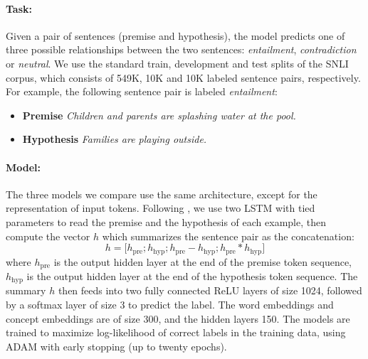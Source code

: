 
\paragraph{Task:}
Given a pair of sentences (premise and hypothesis), the model predicts one of three possible relationships between the two sentences: \textit{entailment}, \textit{contradiction} or \textit{neutral}.
We use the standard train, development and test splits of the SNLI corpus, which consists of 549K, 10K and 10K labeled sentence pairs, respectively.
For example, the following sentence pair is labeled \textit{entailment}:
 \begin{itemize}
  \item \textbf{Premise} \textit{Children and parents are splashing water at the pool.}
  \item \textbf{Hypothesis} \textit{Families are playing outside.}
 \end{itemize}
\paragraph{Model:}
The three models we compare use the same architecture, except for the representation of input tokens.
Following \cite{mou2015recognizing}, we use two LSTM with tied parameters to read the premise and the hypothesis of each example, then compute the vector $h$ which summarizes the sentence pair as the concatenation:
$$h=\big[h_{\text{pre}}; h_{\text{hyp}}; h_{\text{pre}} -h_{\text{hyp}};h_{\text{pre}} *h_{\text{hyp}}\big]$$
where $h_\text{pre}$ is the output hidden layer at the end of the premise token sequence, $h_\text{hyp}$ is the output hidden layer at the end of the hypothesis token sequence.
The summary $h$ then feeds into two fully connected ReLU layers of size 1024, followed by a softmax layer of size 3 to predict the label.
The word embeddings and concept embeddings are of size 300, and the hidden layers 150.
The models are trained to maximize log-likelihood of correct labels in the training data, using ADAM \citep{kingma2014adam} with early stopping (up to twenty epochs).

